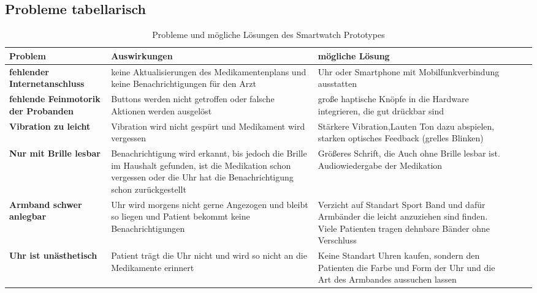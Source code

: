 \subsection{Probleme tabellarisch}
\begin{table}[]
\centering
\caption{Probleme und mögliche Lösungen des Smartwatch Prototypes}
\label{my-label}
\begin{tabular}{p{4cm} p{5cm} p{5cm}|l|l|l|}
\hline
 Problem  &Auswirkungen  &mögliche Lösung  \\ \hline
 \textbf{fehlender Internetanschluss}  &keine Aktualisierungen des Medikamentenplans und keine Benachrichtigungen für den Arzt &Uhr oder Smartphone mit Mobilfunkverbindung ausstatten  \\
 \textbf{fehlende Feinmotorik der Probanden} &Buttons werden nicht getroffen oder falsche Aktionen werden ausgelöst  &große haptische Knöpfe in die Hardware integrieren, die gut drückbar sind  \\
 \textbf{Vibration zu leicht}&Vibration wird nicht gespürt und Medikament wird vergessen  &Stärkere Vibration,Lauten Ton dazu abspielen, starken optisches Feedback (grelles Blinken)   \\
 \textbf{Nur mit Brille lesbar} &Benachrichtigung wird erkannt, bis jedoch die Brille im Haushalt gefunden, ist die Medikation schon vergessen oder die Uhr hat die Benachrichtigung schon zurückgestellt  &Größeres Schrift, die Auch ohne Brille lesbar ist. Audiowiedergabe der Medikation  \\
 \textbf{Armband schwer anlegbar}&Uhr wird morgens nicht gerne Angezogen und bleibt so liegen und Patient bekommt keine Benachrichtigungen  &Verzicht auf Standart Sport Band und dafür Armbänder die leicht anzuziehen sind finden. Viele Patienten tragen dehnbare Bänder ohne Verschluss \\
 \textbf{Uhr ist unästhetisch}&Patient trägt die Uhr nicht und wird so nicht an die Medikamente erinnert  &Keine Standart Uhren kaufen, sondern den Patienten die Farbe und Form der Uhr und die Art des Armbandes aussuchen lassen  \\ \hline
\end{tabular}
\end{table}

